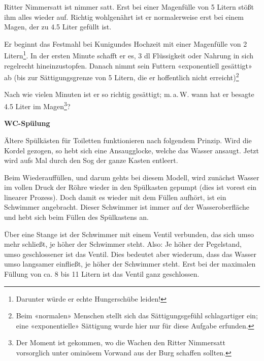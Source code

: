 Ritter Nimmersatt ist nimmer satt. Erst bei einer Magenfülle von
5 Litern stößt ihm alles wieder auf. Richtig wohlgenährt ist er
normalerweise erst bei einem Magen, der zu 4.5 Liter gefüllt ist.

Er beginnt das Festmahl bei Kunigundes Hochzeit mit einer Magenfülle
von 2 Litern\footnote{Darunter würde er echte Hungerschübe
  leiden!}. In der ersten Minute schafft er es, 3 dl Flüssigkeit oder Nahrung
in sich regelrecht hineinzustopfen. Danach nimmt sein Futtern
«exponentiell gesättigt» ab (bis zur Sättigungsgrenze von 5 Litern, die er
hoffentlich nicht erreicht)\footnote{Beim «normalen» Menschen stellt
  sich das Sättigungsgefühl schlagartiger ein; eine «exponentielle»
  Sättigung wurde hier nur für diese Aufgabe erfunden.}%

Nach wie vielen Minuten ist er so richtig gesättigt; m.\,a.\,W. wann
hat er besagte 4.5 Liter im Magen\footnote{Der Moment ist gekommen, wo
  die Wachen den Ritter Nimmersatt vorsorglich unter ominösem Vorwand aus der Burg schaffen sollten.}?

\newpage



\bbwActAufgabenNr{} \textbf{WC-Spülung}\par
Ältere Spülkästen für Toiletten funktionieren nach folgendem Prinzip.
Wird die Kordel gezogen, so hebt sich eine
Ansaugglocke, welche das Wasser ansaugt. Jetzt wird aufs Mal durch den
Sog der ganze Kasten entleert.

Beim Wiederauffüllen, und darum gehts bei diesem Modell, wird zunächst
Wasser im vollen Druck der Röhre wieder in den Spülkasten
gepumpt (dies ist vorest ein linearer Prozess). Doch damit es wieder mit dem Füllen aufhört,
ist ein Schwimmer angebracht. Dieser Schwimmer ist immer auf der
Wasseroberfläche und hebt sich beim Füllen des Spülkastens an.

Über eine Stange ist der Schwimmer
mit einem Ventil verbunden, das sich umso mehr schließt, je höher der
Schwimmer steht. Also: Je höher der Pegelstand, umso geschlossener ist
das Ventil. Dies bedeutet aber wiederum, dass das Wasser umso
langsamer einfließt, je höher der Schwimmer steht. Erst bei der
maximalen Füllung von ca. 8 bis 11 Litern ist das Ventil ganz
geschlossen. 

